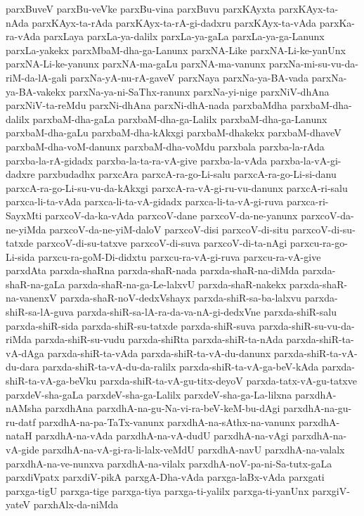 {parxBuveV
parxBu-veVke
parxBu-vina
parxBuvu
parxKAyxta
parxKAyx-ta-nAda
parxKAyx-ta-rAda
parxKAyx-ta-rA-gi-dadxru
parxKAyx-ta-vAda
parxKa-ra-vAda
parxLaya
parxLa-ya-dalilx
parxLa-ya-gaLa
parxLa-ya-ga-Lanunx
parxLa-yakekx
parxMbaM-dha-ga-Lanunx
parxNA-Like
parxNA-Li-ke-yanUnx
parxNA-Li-ke-yanunx
parxNA-ma-gaLu
parxNA-ma-vanunx
parxNa-mi-su-vu-da-riM-da-lA-gali
parxNa-yA-nu-rA-gaveV
parxNaya
parxNa-ya-BA-vada
parxNa-ya-BA-vakekx
parxNa-ya-ni-SaThx-ranunx
parxNa-yi-nige
parxNiV-dhAna
parxNiV-ta-reMdu
parxNi-dhAna
parxNi-dhA-nada
parxbaMdha
parxbaM-dha-dalilx
parxbaM-dha-gaLa
parxbaM-dha-ga-Lalilx
parxbaM-dha-ga-Lanunx
parxbaM-dha-gaLu
parxbaM-dha-kAkxgi
parxbaM-dhakekx
parxbaM-dhaveV
parxbaM-dha-voM-danunx
parxbaM-dha-voMdu
parxbala
parxba-la-rAda
parxba-la-rA-gidadx
parxba-la-ta-ra-vA-give
parxba-la-vAda
parxba-la-vA-gi-dadxre
parxbudadhx
parxcAra
parxcA-ra-go-Li-salu
parxcA-ra-go-Li-si-danu
parxcA-ra-go-Li-su-vu-da-kAkxgi
parxcA-ra-vA-gi-ru-vu-danunx
parxcA-ri-salu
parxca-li-ta-vAda
parxca-li-ta-vA-gidadx
parxca-li-ta-vA-gi-ruva
parxca-ri-SayxMti
parxcoV-da-ka-vAda
parxcoV-dane
parxcoV-da-ne-yanunx
parxcoV-da-ne-yiMda
parxcoV-da-ne-yiM-daloV
parxcoV-disi
parxcoV-di-situ
parxcoV-di-su-tatxde
parxcoV-di-su-tatxve
parxcoV-di-suva
parxcoV-di-ta-nAgi
parxcu-ra-go-Li-sida
parxcu-ra-goM-Di-didxtu
parxcu-ra-vA-gi-ruva
parxcu-ra-vA-give
parxdAta
parxda-shaRna
parxda-shaR-nada
parxda-shaR-na-diMda
parxda-shaR-na-gaLa
parxda-shaR-na-ga-Le-lalxvU
parxda-shaR-nakekx
parxda-shaR-na-vanenxV
parxda-shaR-noV-dedxVshayx
parxda-shiR-sa-ba-lalxvu
parxda-shiR-sa-lA-guva
parxda-shiR-sa-lA-ra-da-va-nA-gi-dedxVne
parxda-shiR-salu
parxda-shiR-sida
parxda-shiR-su-tatxde
parxda-shiR-suva
parxda-shiR-su-vu-da-riMda
parxda-shiR-su-vudu
parxda-shiRta
parxda-shiR-ta-nAda
parxda-shiR-ta-vA-dAga
parxda-shiR-ta-vAda
parxda-shiR-ta-vA-du-danunx
parxda-shiR-ta-vA-du-dara
parxda-shiR-ta-vA-du-da-ralilx
parxda-shiR-ta-vA-ga-beV-kAda
parxda-shiR-ta-vA-ga-beVku
parxda-shiR-ta-vA-gu-titx-deyoV
parxda-tatx-vA-gu-tatxve
parxdeV-sha-gaLa
parxdeV-sha-ga-Lalilx
parxdeV-sha-ga-La-lilxna
parxdhA-nAMsha
parxdhAna
parxdhA-na-gu-Na-vi-ra-beV-keM-bu-dAgi
parxdhA-na-gu-ru-datf
parxdhA-na-pa-TaTx-vanunx
parxdhA-na-sAthx-na-vanunx
parxdhA-nataH
parxdhA-na-vAda
parxdhA-na-vA-dudU
parxdhA-na-vAgi
parxdhA-na-vA-gide
parxdhA-na-vA-gi-ra-li-lalx-veMdU
parxdhA-navU
parxdhA-na-valalx
parxdhA-na-ve-nunxva
parxdhA-na-vilalx
parxdhA-noV-pa-ni-Sa-tutx-gaLa
parxdiVpatx
parxdiV-pikA
parxgA-Dha-vAda
parxga-laBx-vAda
parxgati
parxga-tigU
parxga-tige
parxga-tiya
parxga-ti-yalilx
parxga-ti-yanUnx
parxgiV-yateV
parxhAlx-da-niMda
}
